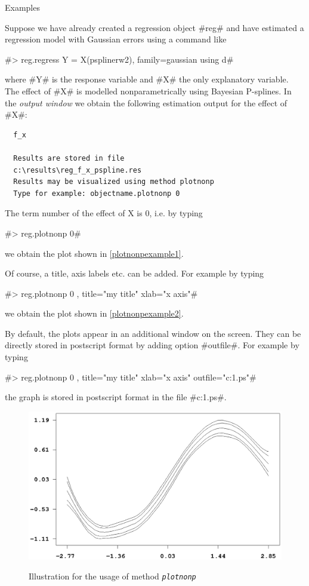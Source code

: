 \begin{stanza}{Examples}

Suppose we have already created a regression object #reg# and have
estimated a regression model with Gaussian errors using a command
like

#> reg.regress Y = X(psplinerw2), family=gaussian using d#

where #Y# is the response variable and #X# the only explanatory
variable. The effect of #X# is modelled nonparametrically using
Bayesian P-splines. In the {\em output window} we obtain the
following estimation output for the effect of #X#:

\begin{verbatim}
  f_x

  Results are stored in file
  c:\results\reg_f_x_pspline.res
  Results may be visualized using method plotnonp
  Type for example: objectname.plotnonp 0
\end{verbatim}

The term number of the effect of X is 0, i.e. by typing

#> reg.plotnonp 0#

we obtain the plot shown in \autoref{plotnonpexample1}.

Of course, a title, axis labels etc. can be added. For example by
typing

#> reg.plotnonp 0 , title="my title" xlab="x axis"#

we obtain the plot shown in \autoref{plotnonpexample2}.

By default, the plots appear in an additional window on the
screen. They can be directly stored in postscript format by adding
option #outfile#. For example by typing

 #> reg.plotnonp 0 , title="my title" xlab="x axis" outfile="c:\results\result1.ps"#

the graph is stored in postscript format in the file
#c:\results\result1.ps#.


\begin{figure}[p]
\begin{center}
\includegraphics[scale=0.8]{grafiken/plotnonpexample.ps}
{\em\caption{ \label{plotnonpexample1} Illustration for the usage of
method \em\tt plotnonp}}
\end{center}
\end{figure}



\end{stanza}
